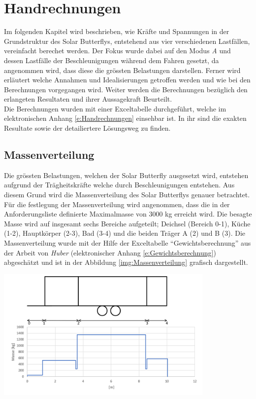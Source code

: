\section{Handrechnungen}
\label{Handrechnungen}
Im folgenden Kapitel wird beschrieben, wie Kräfte und Spannungen in der Grundstruktur des Solar Butterflys, entstehend aus vier verschiedenen Lastfällen, vereinfacht berechet werden. Der Fokus wurde dabei auf den Modus \emph{A} und dessen Lastfälle der Beschleunigungen während dem Fahren gesetzt, da angenommen wird, dass diese die grössten Belastungen darstellen. Ferner wird erläutert welche Annahmen und Idealisierungen getroffen werden und wie bei den Berechnungen vorgegangen wird. Weiter werden die Berechnungen bezüglich den erlangeten Resultaten und ihrer Aussagekraft Beurteilt.\\
Die Berechnungen wurden mit einer Exceltabelle durchgeführt, welche im elektronischen Anhang \ref{e:Handrechnungen} einsehbar ist. In ihr sind die exakten Resultate sowie der detailiertere Lösungsweg zu finden.

\subsection{Massenverteilung}
\label{Massenverteilung}
Die grössten Belastungen, welchen der Solar Butterfly ausgesetzt wird, entstehen aufgrund der Trägheitskräfte welche durch Beschleunigungen entstehen. Aus diesem Grund wird die Massenverteilung des Solar Butterflys genauer betrachtet.\\
Für die festlegung der Massenverteilung wird angenommen, dass die in der Anforderungsliste definierte Maximalmasse von 3000 kg erreicht wird. Die besagte Masse wird auf insgesamt sechs Bereiche aufgeteilt; Deichsel (Bereich 0-1), Küche (1-2), Hauptkörper (2-3), Bad (3-4) und die beiden Träger A (2) und B (3). Die Massenverteilung wurde mit der Hilfe der Exceltabelle ``Gewichtsberechnung'' aus der Arbeit von \emph{Huber} \cite{Huber} (elektronischer Anhang \ref{e:Gewichtsberechnung}) abgeschätzt und ist in der Abbildung \ref{img:Massenverteilung} grafisch dargestellt.

\begin{center}
  \includegraphics[width=0.8\textwidth]{04_Figures/Massenverteilung.png}
  \label{img:Massenverteilung}
\end{center}

